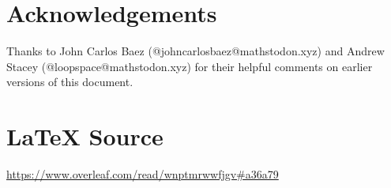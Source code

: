 \documentclass{article}
\theoremstyle{definition}
\begin{document}
\section*{Acknowledgements}
\label{section:acknowledgements}
Thanks to John Carlos Baez (@johncarlosbaez@mathstodon.xyz) and
Andrew Stacey (@loopspace@mathstodon.xyz) for their helpful
comments on earlier versions of this document.
%
%
\section*{\LaTeX \hspace{0.025 mm} Source}
\url{https://www.overleaf.com/read/wnptmrwwfjgv#a36a79}
%
%
%


%
%
%
\end{document}
